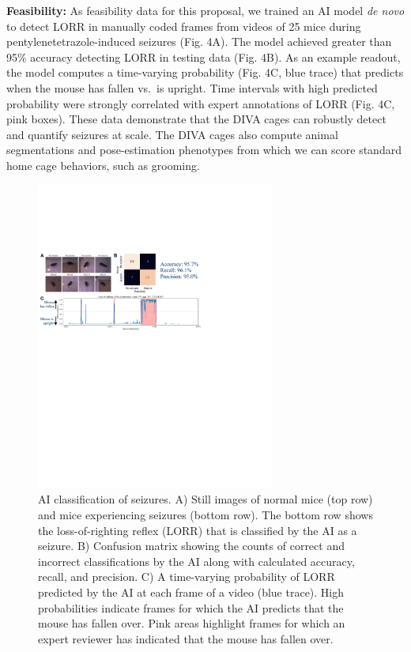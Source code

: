 \documentclass[
  12pt,
]{article}
\begin{document}
\textbf{Feasibility:} As feasibility data for this proposal, we trained
an AI model \textit{de novo} to detect LORR in manually coded frames
from videos of 25 mice during pentylenetetrazole-induced seizures (Fig.
4A). The model achieved greater than 95\% accuracy detecting LORR in
testing data (Fig. 4B). As an example readout, the model computes a
time-varying probability (Fig. 4C, blue trace) that predicts when the
mouse has fallen vs.~is upright. Time intervals with high predicted
probability were strongly correlated with expert annotations of LORR
(Fig. 4C, pink boxes). These data demonstrate that the DIVA cages can
robustly detect and quantify seizures at scale. The DIVA cages also
compute animal segmentations and pose-estimation phenotypes from which
we can score standard home cage behaviors, such as grooming.

\begin{figure}[ht!]
\includegraphics[width=0.7\textwidth]{Fig3.pdf} 
\caption{AI classification of seizures. A) Still images of normal mice (top row) and mice experiencing seizures (bottom row). The bottom row shows the loss-of-righting reflex (LORR) that is classified by the AI as a seizure. B) Confusion matrix showing the counts of correct and incorrect classifications by the AI along with calculated accuracy, recall, and precision. C) A time-varying probability of LORR predicted by the AI at each frame of a video (blue trace). High probabilities indicate frames for which the AI predicts that the mouse has fallen over. Pink areas highlight frames for which an expert reviewer has indicated that the mouse has fallen over.}
\label{fig:LORR}
\end{figure}
\end{document}
